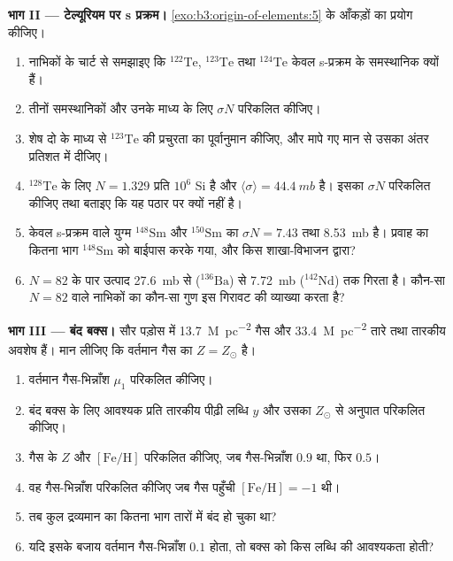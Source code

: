 \begin{problem}[{सप्ताहांत समस्या --- सौर मिश्रण से दीर्घजीवी तारों की
धात्विकताओं तक}]
\medskip\noindent\textbf{भाग II --- टेल्यूरियम पर s प्रक्रम।}
\cref{exo:b3:origin-of-elements:5} के आँकड़ों का प्रयोग कीजिए।
\begin{enumerate}[resume]
\item नाभिकों के चार्ट से समझाइए कि $^{122}\mathrm{Te}$,
  $^{123}\mathrm{Te}$ तथा $^{124}\mathrm{Te}$ केवल s-प्रक्रम के समस्थानिक क्यों हैं।
\item तीनों समस्थानिकों और उनके माध्य के लिए $\sigma N$ परिकलित कीजिए।
\item शेष दो के माध्य से $^{123}\mathrm{Te}$ की प्रचुरता का पूर्वानुमान कीजिए,
  और मापे गए मान से उसका अंतर
  प्रतिशत में दीजिए।
\item $^{128}\mathrm{Te}$ के लिए $N = 1.329$ प्रति $10^6$ Si है और
  $\langle\sigma\rangle = \qty{44.4}{mb}$ है। इसका $\sigma N$ परिकलित कीजिए तथा
  बताइए कि यह पठार पर क्यों नहीं है।
\item केवल s-प्रक्रम वाले युग्म $^{148}\mathrm{Sm}$ और $^{150}\mathrm{Sm}$ का
  $\sigma N = \num{7.43}$ तथा \qty{8.53}{mb} है। प्रवाह का कितना भाग
  $^{148}\mathrm{Sm}$ को बाईपास करके गया, और किस शाखा-विभाजन द्वारा?
\item $N = 82$ के पार उत्पाद \qty{27.6}{mb} से
  ($^{136}\mathrm{Ba}$) से \qty{7.72}{mb} ($^{142}\mathrm{Nd}$) तक गिरता है। कौन-सा
  $N = 82$ वाले नाभिकों का कौन-सा गुण इस गिरावट की व्याख्या करता है?
\end{enumerate}

\medskip\noindent\textbf{भाग III --- बंद बक्स।} सौर
पड़ोस में \qty{13.7}{M_\odot.pc^{-2}} गैस और
\qty{33.4}{M_\odot.pc^{-2}} तारे तथा तारकीय अवशेष हैं। मान लीजिए कि वर्तमान गैस का
$Z = Z_\odot$ है।
\begin{enumerate}[resume]
\item वर्तमान गैस-भिन्नाँश $\mu_1$ परिकलित कीजिए।
\item बंद बक्स के लिए आवश्यक प्रति तारकीय पीढ़ी लब्धि $y$ और
  उसका $Z_\odot$ से अनुपात परिकलित कीजिए।
\item गैस के $Z$ और $[\mathrm{Fe/H}]$ परिकलित कीजिए, जब गैस-भिन्नाँश
  $0.9$ था, फिर $0.5$।
\item वह गैस-भिन्नाँश परिकलित कीजिए जब गैस पहुँची
  $[\mathrm{Fe/H}] = -1$ थी।
\item तब कुल द्रव्यमान का कितना भाग तारों में बंद हो चुका था?
\item यदि इसके बजाय वर्तमान गैस-भिन्नाँश $0.1$ होता, तो
  बक्स को किस लब्धि की आवश्यकता होती?
\end{enumerate}


\end{problem}
